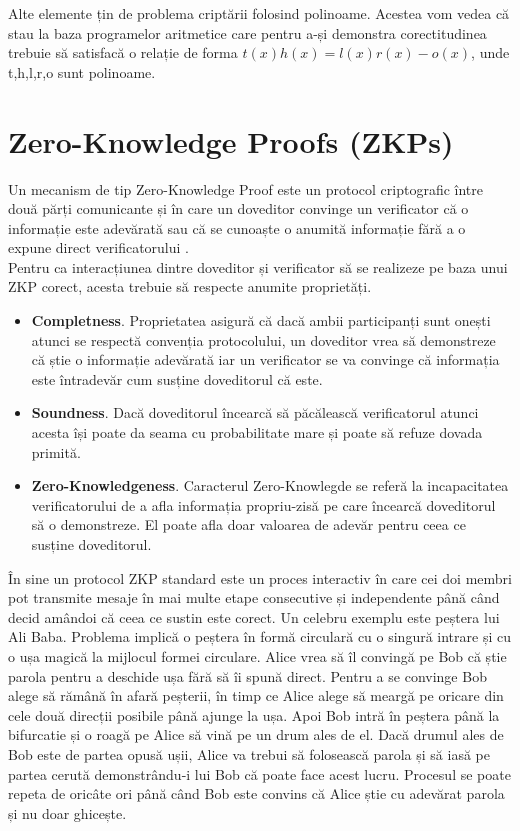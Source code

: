Alte elemente țin de problema criptării folosind polinoame. Acestea vom vedea că stau la baza programelor aritmetice care pentru a-și demonstra corectitudinea trebuie să satisfacă o relație de forma $t(x)h(x) = l(x)r(x) - o(x)$, unde t,h,l,r,o sunt polinoame.\\

\clearpage

\section{Zero-Knowledge Proofs (ZKPs)}

Un mecanism de tip Zero-Knowledge Proof este un protocol criptografic între două părți comunicante și în care un doveditor convinge un verificator că o informație este adevărată sau că se cunoaște o anumită informație fără a o expune direct verificatorului \cite{ZKS_Crypto_Basic}.\\

Pentru ca interacțiunea dintre doveditor și verificator să se realizeze pe baza unui ZKP corect, acesta trebuie să respecte anumite proprietăți.
\begin{itemize}
    \item \textbf{Completness}. Proprietatea asigură că dacă ambii participanți sunt onești atunci se respectă convenția protocolului, un doveditor vrea să demonstreze că știe o informație adevărată iar un verificator se va convinge că informația este întradevăr cum susține doveditorul că este.
    \item \textbf{Soundness}. Dacă doveditorul încearcă să păcălească verificatorul atunci acesta își poate da seama cu probabilitate mare și poate să refuze dovada primită.
    \item \textbf{Zero-Knowledgeness}. Caracterul Zero-Knowlegde se referă la incapacitatea verificatorului de a afla informația propriu-zisă pe care încearcă doveditorul să o demonstreze. El poate afla doar valoarea de adevăr pentru ceea ce susține doveditorul.
\end{itemize}

În sine un protocol ZKP standard este un proces interactiv în care cei doi membri pot transmite mesaje în mai multe etape consecutive și independente până când decid amândoi că ceea ce sustin este corect. Un celebru exemplu este peștera lui Ali Baba. Problema implică o peștera în formă circulară cu o singură intrare și cu o ușa magică la mijlocul formei circulare. Alice vrea să îl convingă pe Bob că știe parola pentru a deschide ușa fără să îi spună direct. Pentru a se convinge Bob alege să rămână în afară peșterii, în timp ce Alice alege să meargă pe oricare din cele două direcții posibile până ajunge la ușa. Apoi Bob intră în peștera până la bifurcatie și o roagă pe Alice să vină pe un drum ales de el. Dacă drumul ales de Bob este de partea opusă ușii, Alice va trebui să folosească parola și să iasă pe partea cerută demonstrându-i lui Bob că poate face acest lucru. Procesul se poate repeta de oricâte ori până când Bob este convins că Alice știe cu adevărat parola și nu doar ghicește. \\

